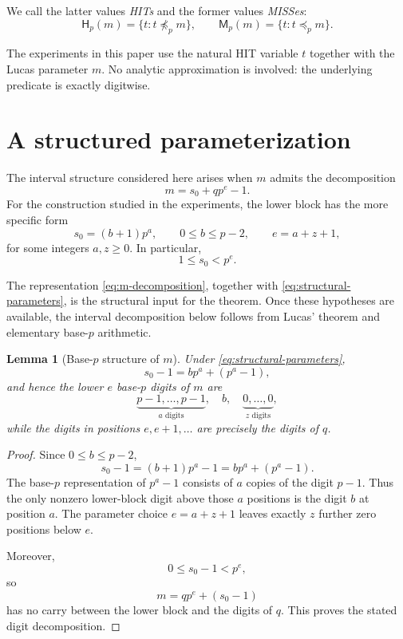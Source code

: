\documentclass[11pt,a4paper]{article}
\newtheorem{lemma}[theorem]{Lemma}
\theoremstyle{definition}
\theoremstyle{remark}
\newcommand{\hit}{\mathsf{H}}
\newcommand{\miss}{\mathsf{M}}
\begin{document}
We call the latter values \emph{HITs} and the former values \emph{MISSes}:
\[
 \hit_p(m)=\{t: t\not\preceq_p m\},
 \qquad
 \miss_p(m)=\{t: t\preceq_p m\}.
\]

The experiments in this paper use the natural HIT variable $t$ together with the Lucas parameter $m$. No analytic approximation is involved: the underlying predicate is exactly digitwise.

\section{A structured parameterization}

The interval structure considered here arises when $m$ admits the decomposition
\begin{equation}
 m=s_0+q p^e-1.
 \label{eq:m-decomposition}
\end{equation}
For the construction studied in the experiments, the lower block has the more specific form
\begin{equation}
 s_0=(b+1)p^a,
 \qquad
 0\le b\le p-2,
 \qquad
 e=a+z+1,
 \label{eq:structural-parameters}
\end{equation}
for some integers $a,z\ge0$.  In particular,
\[
1\le s_0<p^e.
\]

The representation \eqref{eq:m-decomposition}, together with \eqref{eq:structural-parameters}, is the structural input for the theorem.  Once these hypotheses are available, the interval decomposition below follows from Lucas' theorem and elementary base-$p$ arithmetic.

\begin{lemma}[Base-$p$ structure of $m$]
\label{lem:m-digits}
Under \eqref{eq:structural-parameters},
\[
s_0-1=bp^a+(p^a-1),
\]
and hence the lower $e$ base-$p$ digits of $m$ are
\[
\underbrace{p-1,\ldots,p-1}_{a\text{ digits}},
\quad b,
\quad
\underbrace{0,\ldots,0}_{z\text{ digits}},
\]
while the digits in positions $e,e+1,\ldots$ are precisely the digits of $q$.
\end{lemma}

\begin{proof}
Since $0\le b\le p-2$,
\[
s_0-1=(b+1)p^a-1=bp^a+(p^a-1).
\]
The base-$p$ representation of $p^a-1$ consists of $a$ copies of the digit $p-1$.  Thus the only nonzero lower-block digit above those $a$ positions is the digit $b$ at position $a$.  The parameter choice $e=a+z+1$ leaves exactly $z$ further zero positions below $e$.

Moreover,
\[
0\le s_0-1<p^e,
\]
so
\[
m=qp^e+(s_0-1)
\]
has no carry between the lower block and the digits of $q$.  This proves the stated digit decomposition.
\end{proof}
\end{document}
